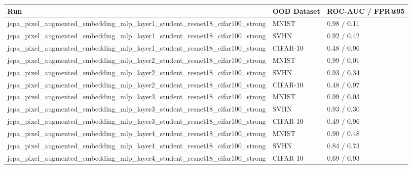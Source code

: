 \begin{tabular}{lll}
\toprule
Run & OOD Dataset & ROC-AUC / FPR@95 \\
\midrule
jepa\_pixel\_augmented\_embedding\_mlp\_layer1\_student\_resnet18\_cifar100\_strong & MNIST & 0.98 / 0.11 \\
jepa\_pixel\_augmented\_embedding\_mlp\_layer1\_student\_resnet18\_cifar100\_strong & SVHN & 0.92 / 0.42 \\
jepa\_pixel\_augmented\_embedding\_mlp\_layer1\_student\_resnet18\_cifar100\_strong & CIFAR-10 & 0.48 / 0.96 \\
jepa\_pixel\_augmented\_embedding\_mlp\_layer2\_student\_resnet18\_cifar100\_strong & MNIST & 0.99 / 0.01 \\
jepa\_pixel\_augmented\_embedding\_mlp\_layer2\_student\_resnet18\_cifar100\_strong & SVHN & 0.93 / 0.34 \\
jepa\_pixel\_augmented\_embedding\_mlp\_layer2\_student\_resnet18\_cifar100\_strong & CIFAR-10 & 0.48 / 0.97 \\
jepa\_pixel\_augmented\_embedding\_mlp\_layer3\_student\_resnet18\_cifar100\_strong & MNIST & 0.99 / 0.03 \\
jepa\_pixel\_augmented\_embedding\_mlp\_layer3\_student\_resnet18\_cifar100\_strong & SVHN & 0.93 / 0.30 \\
jepa\_pixel\_augmented\_embedding\_mlp\_layer3\_student\_resnet18\_cifar100\_strong & CIFAR-10 & 0.49 / 0.96 \\
jepa\_pixel\_augmented\_embedding\_mlp\_layer4\_student\_resnet18\_cifar100\_strong & MNIST & 0.90 / 0.48 \\
jepa\_pixel\_augmented\_embedding\_mlp\_layer4\_student\_resnet18\_cifar100\_strong & SVHN & 0.84 / 0.73 \\
jepa\_pixel\_augmented\_embedding\_mlp\_layer4\_student\_resnet18\_cifar100\_strong & CIFAR-10 & 0.69 / 0.93 \\
\bottomrule
\end{tabular}
